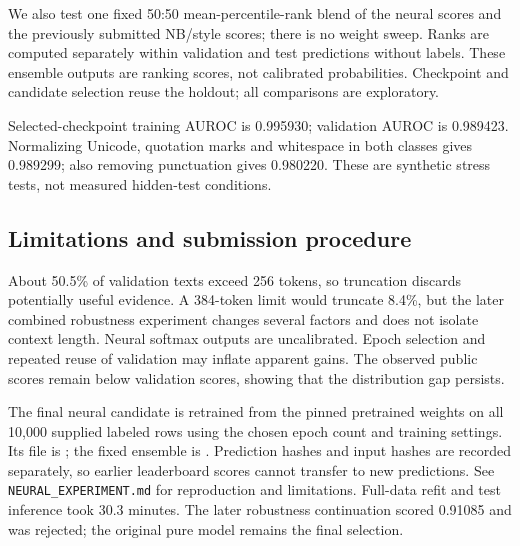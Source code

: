 We also test one fixed 50:50 mean-percentile-rank blend of the neural scores and the previously submitted NB/style scores; there is no weight sweep. Ranks are computed separately within validation and test predictions without labels. These ensemble outputs are ranking scores, not calibrated probabilities. Checkpoint and candidate selection reuse the holdout; all comparisons are exploratory.

Selected-checkpoint training AUROC is 0.995930; validation AUROC is 0.989423. Normalizing Unicode, quotation marks and whitespace in both classes gives 0.989299; also removing punctuation gives 0.980220. These are synthetic stress tests, not measured hidden-test conditions.

\subsection*{Limitations and submission procedure}
About 50.5\% of validation texts exceed 256 tokens, so truncation discards potentially useful evidence. A 384-token limit would truncate 8.4\%, but the later combined robustness experiment changes several factors and does not isolate context length. Neural softmax outputs are uncalibrated. Epoch selection and repeated reuse of validation may inflate apparent gains. The observed public scores remain below validation scores, showing that the distribution gap persists.

The final neural candidate is retrained from the pinned pretrained weights on all 10,000 supplied labeled rows using the chosen epoch count and training settings. Its file is ; the fixed ensemble is . Prediction hashes and input hashes are recorded separately, so earlier leaderboard scores cannot transfer to new predictions. See \texttt{NEURAL\_EXPERIMENT.md} for reproduction and limitations. Full-data refit and test inference took 30.3 minutes. The later robustness continuation scored 0.91085 and was rejected; the original pure model remains the final selection.
\endgroup
